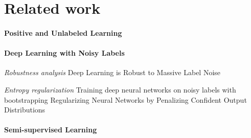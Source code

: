 \section{Related work}
\label{related}

\paragraph{Positive and Unlabeled Learning}

\paragraph{{Deep Learning with Noisy Labels}}

\textit{Robustness analysis}
Deep Learning is Robust to Massive Label Noise \cite{rolnick2017deep}

\textit{Entropy regularization}
Training deep neural networks on noisy labels with bootstrapping \cite{reed2014training}
Regularizing Neural Networks by Penalizing Confident Output Distributions \cite{pereyra2017regularizing}

\textit{}

\paragraph{Semi-supervised Learning}
